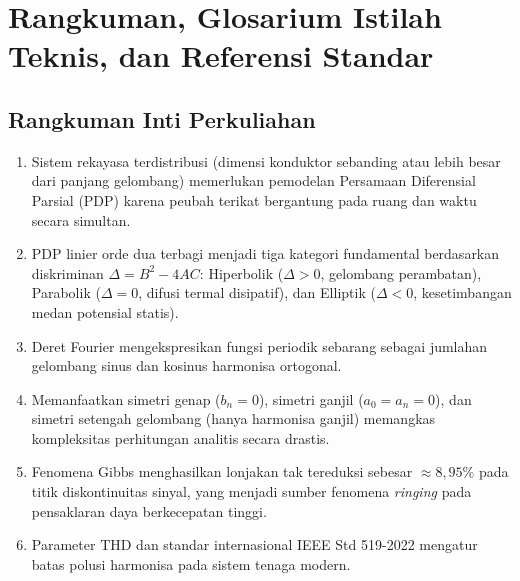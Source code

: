 \documentclass[11pt,a4paper]{article}
\theoremstyle{definition}
\begin{document}
\section{Rangkuman, Glosarium Istilah Teknis, dan Referensi Standar}

\subsection{Rangkuman Inti Perkuliahan}
\begin{enumerate}[leftmargin=*]
    \item Sistem rekayasa terdistribusi (dimensi konduktor sebanding atau lebih besar dari panjang gelombang) memerlukan pemodelan Persamaan Diferensial Parsial (PDP) karena peubah terikat bergantung pada ruang dan waktu secara simultan.
    \item PDP linier orde dua terbagi menjadi tiga kategori fundamental berdasarkan diskriminan $\Delta = B^2 - 4AC$: Hiperbolik ($\Delta > 0$, gelombang perambatan), Parabolik ($\Delta = 0$, difusi termal disipatif), dan Elliptik ($\Delta < 0$, kesetimbangan medan potensial statis).
    \item Deret Fourier mengekspresikan fungsi periodik sebarang sebagai jumlahan gelombang sinus dan kosinus harmonisa ortogonal.
    \item Memanfaatkan simetri genap ($b_n = 0$), simetri ganjil ($a_0 = a_n = 0$), dan simetri setengah gelombang (hanya harmonisa ganjil) memangkas kompleksitas perhitungan analitis secara drastis.
    \item Fenomena Gibbs menghasilkan lonjakan tak tereduksi sebesar $\approx 8{,}95\%$ pada titik diskontinuitas sinyal, yang menjadi sumber fenomena \textit{ringing} pada pensaklaran daya berkecepatan tinggi.
    \item Parameter $\text{THD}$ dan standar internasional IEEE Std 519-2022 mengatur batas polusi harmonisa pada sistem tenaga modern.
\end{enumerate}
\end{document}
